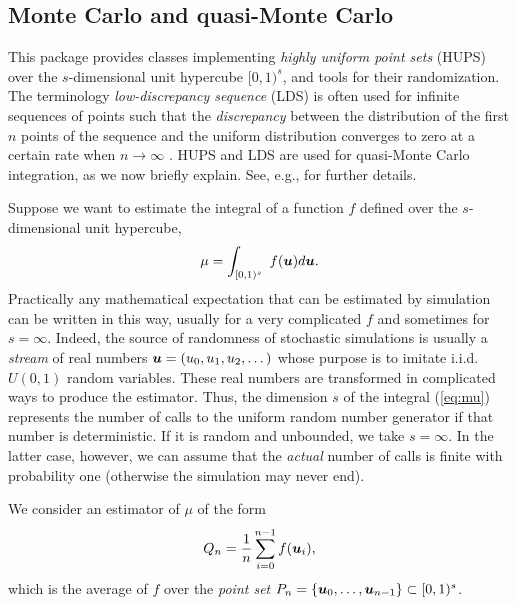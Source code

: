 
\subsection*{Monte Carlo and quasi-Monte Carlo}

This package provides classes implementing \emph{highly uniform point sets}
(HUPS) over the $s$-dimensional unit hypercube $[0,1)^s$,
and tools for their randomization.
The terminology \emph{low-discrepancy sequence} (LDS) is often used
for infinite sequences of points such that the \emph{discrepancy}
between the distribution of the first $n$ points of the sequence and
the uniform distribution converges to zero at a certain rate
when $n\to\infty$ \cite{rNIE92b}.
HUPS and LDS are used for quasi-Monte Carlo integration,
as we now briefly explain.
See, e.g., \cite{vFOX99a,fGLA04a,rHEL98a,vLEC02a,vLEC03b,%
vOWE98a,rNIE92b,vSLO94a,rTEZ95a}
for further details.

Suppose we want to estimate the integral of a function $f$ defined over
the $s$-dimensional unit hypercube,
\begin{equation}
  \mu = \int_{[0,1)^s}\   f(\mbox{\boldmath $u$}) d\mbox{\boldmath $u$}.                      \label{eq:mu}
\end{equation}
Practically any mathematical expectation that can be estimated by
simulation can be written in this way, usually for a very complicated
$f$ and sometimes for $s=\infty$.
Indeed, the source of randomness of stochastic simulations
is usually a \emph{stream} of real numbers $\mbox{\boldmath $u$} = (u_0,u_1,u_2,\dots)$
whose purpose is to imitate i.i.d.\ $U(0,1)$ random variables.
These real numbers are transformed in complicated ways to produce
the estimator.  Thus, the dimension $s$ of the integral (\ref{eq:mu})
represents the number of calls to the uniform random number generator
if that number is deterministic.
If it is random and unbounded, we take $s = \infty$.
In the latter case, however, we can assume that the \emph{actual}
number of calls is finite with probability one (otherwise the simulation
may never end).

We consider an estimator of $\mu$ of the form
\begin{equation}
  Q_n = \frac{1}{n} \sum_{i=0}^{n-1} f(\mbox{\boldmath $u$}_i),             \label{eq:Qn}
\end{equation}
which is the average of $f$ over the \emph{point set}
$P_n = \{\mbox{\boldmath $u$}_0,\dots,\mbox{\boldmath $u$}_{n-1}\} \subset [0,1)^s$.

